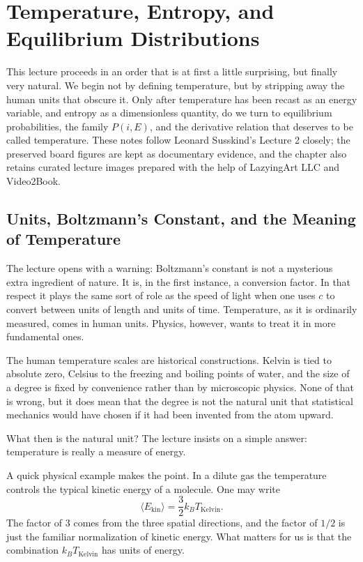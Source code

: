 \chapter{Temperature, Entropy, and Equilibrium Distributions}

This lecture proceeds in an order that is at first a little surprising, but finally very natural. We begin not by defining temperature, but by stripping away the human units that obscure it. Only after temperature has been recast as an energy variable, and entropy as a dimensionless quantity, do we turn to equilibrium probabilities, the family \(P(i,E)\), and the derivative relation that deserves to be called temperature. These notes follow Leonard Susskind's Lecture 2 closely; the preserved board figures are kept as documentary evidence, and the chapter also retains curated lecture images prepared with the help of LazyingArt LLC and Video2Book.

\section{Units, Boltzmann's Constant, and the Meaning of Temperature}

The lecture opens with a warning: Boltzmann's constant is not a mysterious extra ingredient of nature. It is, in the first instance, a conversion factor. In that respect it plays the same sort of role as the speed of light when one uses \(c\) to convert between units of length and units of time. Temperature, as it is ordinarily measured, comes in human units. Physics, however, wants to treat it in more fundamental ones.

The human temperature scales are historical constructions. Kelvin is tied to absolute zero, Celsius to the freezing and boiling points of water, and the size of a degree is fixed by convenience rather than by microscopic physics. None of that is wrong, but it does mean that the degree is not the natural unit that statistical mechanics would have chosen if it had been invented from the atom upward.

What then is the natural unit? The lecture insists on a simple answer: temperature is really a measure of energy.

A quick physical example makes the point. In a dilute gas the temperature controls the typical kinetic energy of a molecule. One may write
\begin{equation}
\langle E_{\mathrm{kin}}\rangle = \frac{3}{2}k_B T_{\mathrm{Kelvin}}.
\end{equation}
The factor of \(3\) comes from the three spatial directions, and the factor of \(1/2\) is just the familiar normalization of kinetic energy. What matters for us is that the combination \(k_B T_{\mathrm{Kelvin}}\) has units of energy.

